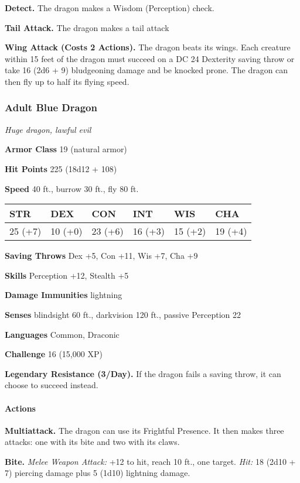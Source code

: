 \documentclass[
]{article}
\begin{document}
\textbf{Detect.} The dragon makes a Wisdom (Perception) check.

\textbf{Tail Attack.} The dragon makes a tail attack

\textbf{Wing Attack (Costs 2 Actions).} The dragon beats its wings. Each
creature within 15 feet of the dragon must succeed on a DC 24 Dexterity
saving throw or take 16 (2d6 + 9) bludgeoning damage and be knocked
prone. The dragon can then fly up to half its flying speed.

\hypertarget{adult-blue-dragon}{%
\subsubsection{Adult Blue Dragon}\label{adult-blue-dragon}}

\emph{Huge dragon, lawful evil}

\textbf{Armor Class} 19 (natural armor)

\textbf{Hit Points} 225 (18d12 + 108)

\textbf{Speed} 40 ft., burrow 30 ft., fly 80 ft.

\begin{longtable}[]{@{}llllll@{}}
\toprule
STR & DEX & CON & INT & WIS & CHA\tabularnewline
\midrule
\endhead
25 (+7) & 10 (+0) & 23 (+6) & 16 (+3) & 15 (+2) & 19 (+4)\tabularnewline
\bottomrule
\end{longtable}

\textbf{Saving Throws} Dex +5, Con +11, Wis +7, Cha +9

\textbf{Skills} Perception +12, Stealth +5

\textbf{Damage Immunities} lightning

\textbf{Senses} blindsight 60 ft., darkvision 120 ft., passive
Perception 22

\textbf{Languages} Common, Draconic

\textbf{Challenge} 16 (15,000 XP)

\textbf{Legendary Resistance (3/Day).} If the dragon fails a saving
throw, it can choose to succeed instead.

\hypertarget{actions-28}{%
\paragraph{Actions}\label{actions-28}}

\textbf{Multiattack.} The dragon can use its Frightful Presence. It then
makes three attacks: one with its bite and two with its claws.

\textbf{Bite.} \emph{Melee Weapon Attack:} +12 to hit, reach 10 ft., one
target. \emph{Hit:} 18 (2d10 + 7) piercing damage plus 5 (1d10)
lightning damage.
\end{document}
